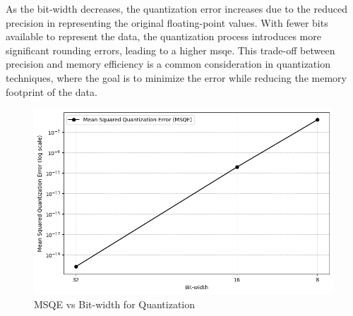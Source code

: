 \documentclass{ioereport}
\begin{document}
As the bit-width decreases, the quantization error increases due to the reduced precision in representing the original floating-point values. With fewer bits available to represent the data, the quantization process introduces more significant rounding errors, leading to a higher \gls{msqe}. This trade-off between precision and memory efficiency is a common consideration in quantization techniques, where the goal is to minimize the error while reducing the memory footprint of the data.

\begin{figure}[H]
    \centering
    \includegraphics[width=\linewidth]{assets/quantization/MSQE_Quantization.png}
    \caption{MSQE vs Bit-width for Quantization}
    \label{fig:msqe-vs-bitwidth}
\end{figure}

\pagebreak


\end{document}
